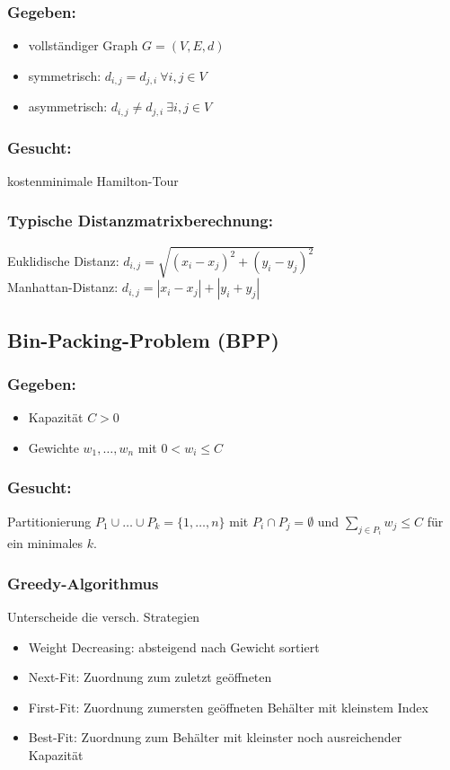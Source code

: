 \documentclass[12pt]{article}
\begin{document}
			\subsubsection*{Gegeben:}
			\begin{itemize}
				\item vollständiger Graph $G=(V,E,d)$
				\item symmetrisch: $d_{i,j}=d_{j,i}\> \forall i,j\in V$
				\item asymmetrisch: $d_{i,j}\neq d_{j,i}\> \exists i,j \in V$
			\end{itemize}
			\subsubsection*{Gesucht:}
			kostenminimale Hamilton-Tour
			
			\subsubsection{Typische Distanzmatrixberechnung:}
			Euklidische Distanz: $d_{i,j}=\sqrt{(x_i-x_j)^2+(y_i-y_j)^2}$ \\
			Manhattan-Distanz: $d_{i,j}=|x_i-x_j|+|y_i+y_j|$
		\subsection{Bin-Packing-Problem (BPP)}
			\subsubsection*{Gegeben:}
				\begin{itemize}
					\item Kapazität $C>0$
					\item Gewichte $w_1,\dots,w_n$ mit $0<w_i\le C$
				\end{itemize}
			\subsubsection*{Gesucht:}
				Partitionierung $P_1\cup\dots\cup P_k = \{1,\dots,n\}$ mit $P_i\cap P_j = \emptyset$ und $\sum_{j\in P_i} w_j \le C$ für ein minimales $k$.

			\subsubsection{Greedy-Algorithmus}\label{BPGreedy}
			Unterscheide die versch. Strategien
			\begin{itemize}
				\item Weight Decreasing: absteigend nach Gewicht sortiert
				\item Next-Fit: Zuordnung zum zuletzt geöffneten
				\item First-Fit: Zuordnung zumersten geöffneten Behälter mit kleinstem Index
				\item Best-Fit: Zuordnung zum Behälter mit kleinster noch ausreichender Kapazität
			\end{itemize}
		
\end{document}
